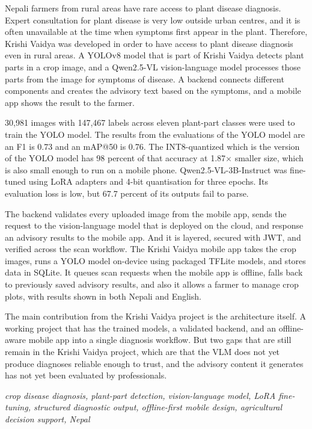 
Nepali farmers from rural areas have rare access to plant disease diagnosis.
Expert consultation for plant disease is very low outside urban centres, and it is often unavailable at the time when symptoms first appear in the plant. Therefore, Krishi Vaidya was developed in order to have access to plant disease diagnosis even in rural areas. A YOLOv8 model that is part of Krishi Vaidya detects plant parts in a crop image, and a Qwen2.5-VL vision-language model processes those parts from the image for symptoms of disease. A backend connects different components and creates the advisory text based on the symptoms, and a mobile app shows the result to the farmer.

30,981 images with 147,467 labels across eleven plant-part classes were used to train the YOLO model. The results from the evaluations of the YOLO model are an F1 is 0.73 and an mAP@50 is 0.76. The INT8-quantized which is the version of the YOLO model has 98 percent of that accuracy at 1.87$\times$ smaller size, which is also small enough to run on a mobile phone. Qwen2.5-VL-3B-Instruct was fine-tuned using LoRA adapters and 4-bit quantisation for three epochs. Its evaluation loss is low, but 67.7 percent of its outputs fail to parse.

The backend validates every uploaded image from the mobile app, sends the request to the vision-language model that is deployed on the cloud, and response an advisory results to the mobile app. And it is layered, secured with JWT, and verified across the scan workflow. The Krishi Vaidya mobile app takes the crop images, runs a YOLO model on-device using packaged TFLite models, and stores data in SQLite. It queues scan requests when the mobile app is offline, falls back to previously saved advisory results, and also it allows a farmer to manage crop plots, with results shown in both Nepali and English. 

The main contribution from the Krishi Vaidya project is the architecture itself. A working project that has the trained models, a validated backend, and an offline-aware mobile app into a single diagnosis workflow. But two gaps that are still remain in the Krishi Vaidya project, which are that the VLM does not yet produce diagnoses reliable enough to trust, and the advisory content it generates has not yet been evaluated by professionals.

\vspace{2\baselineskip}
 \textit{crop disease diagnosis, plant-part detection, vision-language model, LoRA fine-tuning, structured diagnostic output, offline-first mobile design, agricultural decision support, Nepal}